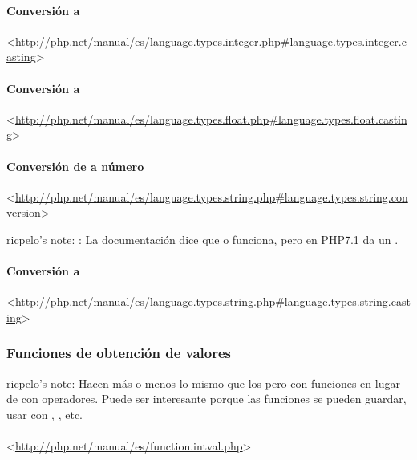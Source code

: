 \documentclass[a4paper,11pt,spanish]{sphinxmanual}
\begin{document}
\paragraph{Conversión a }
\label{\detokenize{php:conversion-a-int}}
\textless{}\url{http://php.net/manual/es/language.types.integer.php\#language.types.integer.casting}\textgreater{}


\paragraph{Conversión a }
\label{\detokenize{php:conversion-a-float}}
\textless{}\url{http://php.net/manual/es/language.types.float.php\#language.types.float.casting}\textgreater{}


\paragraph{Conversión de  a número}
\label{\detokenize{php:conversion-de-string-a-numero}}
\textless{}\url{http://php.net/manual/es/language.types.string.php\#language.types.string.conversion}\textgreater{}

ricpelo's note: : La documentación dice que 
o  funciona, pero en PHP7.1 da un .


\paragraph{Conversión a }
\label{\detokenize{php:conversion-a-string}}
\textless{}\url{http://php.net/manual/es/language.types.string.php\#language.types.string.casting}\textgreater{}


\subsubsection{Funciones de obtención de valores}
\label{\detokenize{php:funciones-de-obtencion-de-valores}}
ricpelo's note: Hacen más o menos lo mismo que los  pero con
funciones en lugar de con operadores. Puede ser interesante porque las
funciones se pueden guardar, usar con , , etc.


\paragraph{}
\label{\detokenize{php:intval}}
\textless{}\url{http://php.net/manual/es/function.intval.php}\textgreater{}
\end{document}
